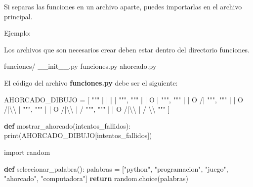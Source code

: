 \documentclass[
  a4paper,
  DIV=11,
  numbers=noendperiod,
  onepage,
  openany]{scrreprt}
\newenvironment{Shaded}{\begin{snugshade}}{\end{snugshade}}
\newcommand{\BuiltInTok}[1]{\textcolor[rgb]{0.00,0.23,0.31}{#1}}
\newcommand{\CharTok}[1]{\textcolor[rgb]{0.13,0.47,0.30}{#1}}
\newcommand{\ControlFlowTok}[1]{\textcolor[rgb]{0.00,0.23,0.31}{\textbf{#1}}}
\newcommand{\ExtensionTok}[1]{\textcolor[rgb]{0.00,0.23,0.31}{#1}}
\newcommand{\ImportTok}[1]{\textcolor[rgb]{0.00,0.46,0.62}{#1}}
\newcommand{\KeywordTok}[1]{\textcolor[rgb]{0.00,0.23,0.31}{\textbf{#1}}}
\newcommand{\NormalTok}[1]{\textcolor[rgb]{0.00,0.23,0.31}{#1}}
\newcommand{\OperatorTok}[1]{\textcolor[rgb]{0.37,0.37,0.37}{#1}}
\newcommand{\StringTok}[1]{\textcolor[rgb]{0.13,0.47,0.30}{#1}}
\begin{document}
Si separas las funciones en un archivo aparte, puedes importarlas en el
archivo principal.

Ejemplo:

Los archivos que son necesarios crear deben estar dentro del directorio
funciones.

\begin{Shaded}
\begin{Highlighting}[]
\ExtensionTok{funciones/}
    \ExtensionTok{\_\_init\_\_.py}
    \ExtensionTok{funciones.py}
\ExtensionTok{ahorcado.py}
\end{Highlighting}
\end{Shaded}

El código del archivo \textbf{funciones.py} debe ser el siguiente:

\begin{Shaded}
\begin{Highlighting}[]
\NormalTok{AHORCADO\_DIBUJO }\OperatorTok{=}\NormalTok{ [}
    \StringTok{"""}
\StringTok{       |}
\StringTok{       |}
\StringTok{       |}
\StringTok{       |}
\StringTok{    """}\NormalTok{,}
    \StringTok{"""}
\StringTok{       |}
\StringTok{       |}
\StringTok{       O}
\StringTok{       |}
\StringTok{    """}\NormalTok{,}
    \StringTok{"""}
\StringTok{       |}
\StringTok{       |}
\StringTok{       O}
\StringTok{      /|}
\StringTok{    """}\NormalTok{,}
    \StringTok{"""}
\StringTok{       |}
\StringTok{       |}
\StringTok{       O}
\StringTok{      /|}\CharTok{\textbackslash{}\textbackslash{}}
\StringTok{       |}
\StringTok{    """}\NormalTok{,}
    \StringTok{"""}
\StringTok{       |}
\StringTok{       |}
\StringTok{       O}
\StringTok{      /|}\CharTok{\textbackslash{}\textbackslash{}}
\StringTok{       |}
\StringTok{      /}
\StringTok{    """}\NormalTok{,}
    \StringTok{"""}
\StringTok{       |}
\StringTok{       |}
\StringTok{       O}
\StringTok{      /|}\CharTok{\textbackslash{}\textbackslash{}}
\StringTok{       |}
\StringTok{      / }\CharTok{\textbackslash{}\textbackslash{}}
\StringTok{    """}
\NormalTok{]}

\KeywordTok{def}\NormalTok{ mostrar\_ahorcado(intentos\_fallidos):}
    \BuiltInTok{print}\NormalTok{(AHORCADO\_DIBUJO[intentos\_fallidos])}

\ImportTok{import}\NormalTok{ random}

\KeywordTok{def}\NormalTok{ seleccionar\_palabra():}
\NormalTok{    palabras }\OperatorTok{=}\NormalTok{ [}\StringTok{"python"}\NormalTok{, }\StringTok{"programacion"}\NormalTok{, }\StringTok{"juego"}\NormalTok{, }\StringTok{"ahorcado"}\NormalTok{, }\StringTok{"computadora"}\NormalTok{]}
    \ControlFlowTok{return}\NormalTok{ random.choice(palabras)}


\end{Highlighting}
\end{Shaded}
\end{document}

